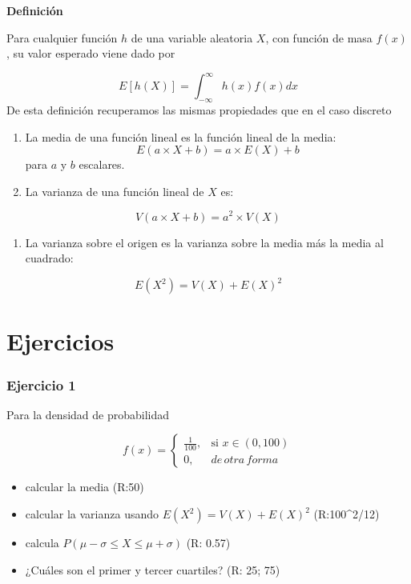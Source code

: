 \documentclass[
]{book}
\providecommand{\tightlist}{%
  \setlength{\itemsep}{0pt}\setlength{\parskip}{0pt}}
\begin{document}
\textbf{Definición}

Para cualquier función \(h\) de una variable aleatoria \(X\), con función de masa \(f(x)\), su valor esperado viene dado por

\[E[h(X)]= \int_{-\infty}^{\infty} h(x) f(x)dx\]
De esta definición recuperamos las mismas propiedades que en el caso discreto

\begin{enumerate}
\def\labelenumi{\arabic{enumi})}
\item
  La media de una función lineal es la función lineal de la media: \[ E( a\times X +b)= a\times E(X) +b\] para \(a\) y \(b\) escalares.
\item
  La varianza de una función lineal de \(X\) es:
\end{enumerate}

\[V(a\times X +b)= a^2\times V(X)\]

\begin{enumerate}
\def\labelenumi{\arabic{enumi})}
\setcounter{enumi}{2}
\tightlist
\item
  La varianza sobre el origen es la varianza sobre la media más la media al cuadrado:
\end{enumerate}

\[E(X^2)= V(X)+E(X)^2\]

\hypertarget{ejercicios-4}{%
\section{Ejercicios}\label{ejercicios-4}}

\hypertarget{ejercicio-1-3}{%
\subsubsection{Ejercicio 1}\label{ejercicio-1-3}}

Para la densidad de probabilidad

\[
    f(x)= 
\begin{cases}
    \frac{1}{100},& \text{si } x\in (0,100)\\
    0,& de\, otra\, forma 
\end{cases}
\]

\begin{itemize}
\tightlist
\item
  calcular la media (R:50)
\item
  calcular la varianza usando \(E(X^2)= V(X)+E(X)^2\) (R:100\^{}2/12)
\item
  calcula \(P( \mu-\sigma \leq X \leq \mu+\sigma)\) (R: 0.57)
\item
  ¿Cuáles son el primer y tercer cuartiles? (R: 25; 75)
\end{itemize}
\end{document}
